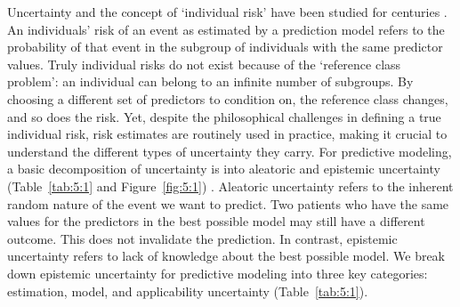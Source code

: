 Uncertainty and the concept of `individual risk' have been studied for centuries \cite{sternAccuracyPreoperativeRisk2025,altmanWhatWeMean2000,hackingEmergenceProbabilityPhilosophical2006,finettiTheoryProbabilityCritical1979,vennLogicChance1876,vonmisesProbabilityStatisticsTruth1957,laplacePhilosophicalEssayProbabilities1902,lemeshowOutcomePredictionIndividual1995,hendersonIndividualSurvivalTime2005,steyerbergEquallyValidModels2005}. An individuals' risk of an event as estimated by a prediction model refers to the probability of that event in the subgroup of individuals with the same predictor values. Truly individual risks do not exist because of the `reference class problem': an individual can belong to an infinite number of subgroups. By choosing a different set of predictors to condition on, the reference class changes, and so does the risk. Yet, despite the philosophical challenges in defining a true individual risk, risk estimates are routinely used in practice, making it crucial to understand the different types of uncertainty they carry. For predictive modeling, a basic decomposition of uncertainty is into aleatoric and epistemic uncertainty (Table~\ref{tab:5:1} and Figure~\ref{fig:5:1}) \cite{hullermeierAleatoricEpistemicUncertainty2021,sengeReliableClassificationLearning2014}. Aleatoric uncertainty refers to the inherent random nature of the event we want to predict. Two patients who have the same values for the predictors in the best possible model may still have a different outcome. This does not invalidate the prediction. In contrast, epistemic uncertainty refers to lack of knowledge about the best possible model. We break down epistemic uncertainty for predictive modeling into three key categories: estimation, model, and applicability uncertainty (Table~\ref{tab:5:1}).


